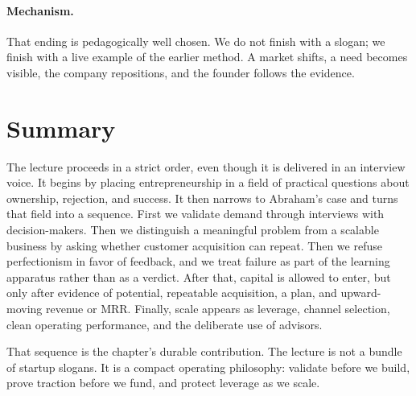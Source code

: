 \paragraph{Mechanism.} That ending is pedagogically well chosen. We do not finish with a slogan; we finish with a live example of the earlier method. A market shifts, a need becomes visible, the company repositions, and the founder follows the evidence.

\section{Summary}

The lecture proceeds in a strict order, even though it is delivered in an interview voice. It begins by placing entrepreneurship in a field of practical questions about ownership, rejection, and success. It then narrows to Abraham's case and turns that field into a sequence. First we validate demand through interviews with decision-makers. Then we distinguish a meaningful problem from a scalable business by asking whether customer acquisition can repeat. Then we refuse perfectionism in favor of feedback, and we treat failure as part of the learning apparatus rather than as a verdict. After that, capital is allowed to enter, but only after evidence of potential, repeatable acquisition, a plan, and upward-moving revenue or \(\mathrm{MRR}\). Finally, scale appears as leverage, channel selection, clean operating performance, and the deliberate use of advisors.

That sequence is the chapter's durable contribution. The lecture is not a bundle of startup slogans. It is a compact operating philosophy: validate before we build, prove traction before we fund, and protect leverage as we scale.